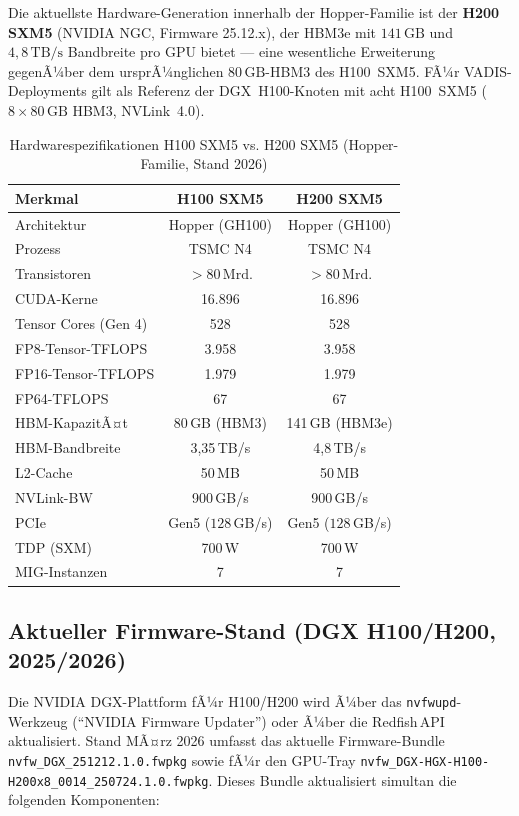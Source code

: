 ﻿\documentclass[12pt,a4paper]{article}
\begin{document}
Die aktuellste Hardware-Generation innerhalb der Hopper-Familie
ist der \textbf{H200 SXM5} (NVIDIA NGC, Firmware 25.12.x),
der HBM3e mit $141\,\text{GB}$ und $4{,}8\,\text{TB/s}$
Bandbreite pro GPU bietet --- eine wesentliche Erweiterung
gegenÃ¼ber dem ursprÃ¼nglichen $80\,\text{GB}$-HBM3 des H100~SXM5.
FÃ¼r VADIS-Deployments gilt als Referenz der DGX~H100-Knoten
mit acht H100~SXM5 ($8 \times 80\,\text{GB}$ HBM3, NVLink~4.0).

\begin{table}[ht]
\centering
\small
\caption{Hardwarespezifikationen H100 SXM5 vs. H200 SXM5 (Hopper-Familie, Stand 2026)}
\label{tab:h100_specs}
\begin{tabular}{@{}lcc@{}}
\toprule
\textbf{Merkmal} & \textbf{H100 SXM5} & \textbf{H200 SXM5} \\
\midrule
Architektur & Hopper (GH100) & Hopper (GH100) \\
Prozess & TSMC N4 & TSMC N4 \\
Transistoren & $>80\,\text{Mrd.}$ & $>80\,\text{Mrd.}$ \\
CUDA-Kerne & 16.896 & 16.896 \\
Tensor Cores (Gen 4) & 528 & 528 \\
FP8-Tensor-TFLOPS & 3.958 & 3.958 \\
FP16-Tensor-TFLOPS & 1.979 & 1.979 \\
FP64-TFLOPS & 67 & 67 \\
HBM-KapazitÃ¤t & 80\,GB (HBM3) & 141\,GB (HBM3e) \\
HBM-Bandbreite & 3,35\,TB/s & 4,8\,TB/s \\
L2-Cache & 50\,MB & 50\,MB \\
NVLink-BW & 900\,GB/s & 900\,GB/s \\
PCIe & Gen5 ($128$\,GB/s) & Gen5 ($128$\,GB/s) \\
TDP (SXM) & 700\,W & 700\,W \\
MIG-Instanzen & 7 & 7 \\
\bottomrule
\end{tabular}
\end{table}

\subsection{Aktueller Firmware-Stand (DGX H100/H200, 2025/2026)}
\label{sub:h100_firmware}

Die NVIDIA DGX-Plattform fÃ¼r H100/H200 wird Ã¼ber das
\texttt{nvfwupd}-Werkzeug (``NVIDIA Firmware Updater'') oder
Ã¼ber die Redfish\,API aktualisiert. Stand MÃ¤rz 2026 umfasst
das aktuelle Firmware-Bundle \texttt{nvfw\_DGX\_251212.1.0.fwpkg}
sowie fÃ¼r den GPU-Tray \texttt{nvfw\_DGX-HGX-H100-H200x8\_0014\_250724.1.0.fwpkg}.
Dieses Bundle aktualisiert simultan die folgenden Komponenten:
\end{document}
